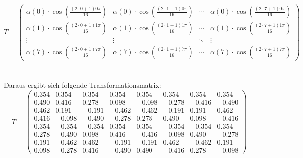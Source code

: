 \documentclass[12pt]{article}
\begin{document}
		
		\[
		T = \left( \begin{array}{cccccccc}
			\alpha(0) \cdot \cos\left(\frac{(2\cdot0+1)0\pi}{16}\right) & \alpha(0) \cdot \cos\left(\frac{(2\cdot1+1)0\pi}{16}\right) & \cdots & \alpha(0) \cdot \cos\left(\frac{(2\cdot7+1)0\pi}{16}\right) \\
			\alpha(1) \cdot \cos\left(\frac{(2\cdot0+1)1\pi}{16}\right) & \alpha(1) \cdot \cos\left(\frac{(2\cdot1+1)1\pi}{16}\right) & \cdots & \alpha(1) \cdot \cos\left(\frac{(2\cdot7+1)1\pi}{16}\right) \\
			\vdots & \vdots & \ddots & \vdots \\
			\alpha(7) \cdot \cos\left(\frac{(2\cdot0+1)7\pi}{16}\right) & \alpha(7) \cdot \cos\left(\frac{(2\cdot1+1)7\pi}{16}\right) & \cdots & \alpha(7) \cdot \cos\left(\frac{(2\cdot7+1)7\pi}{16}\right)
		\end{array} \right)
		\]
		\\\\
		Daraus ergibt sich folgende Transformationsmatrix: \\
	\[
	T = \left( \begin{array}{cccccccc}
			0.354 & 0.354 & 0.354 & 0.354 & 0.354 & 0.354 & 0.354 & 0.354 \\
			0.490 & 0.416 & 0.278 & 0.098 & -0.098 & -0.278 & -0.416 & -0.490 \\
			0.462 & 0.191 & -0.191 & -0.462 & -0.462 & -0.191 & 0.191 & 0.462 \\
			0.416 & -0.098 & -0.490 & -0.278 & 0.278 & 0.490 & 0.098 & -0.416 \\
			0.354 & -0.354 & -0.354 & 0.354 & 0.354 & -0.354 & -0.354 & 0.354 \\
			0.278 & -0.490 & 0.098 & 0.416 & -0.416 & -0.098 & 0.490 & -0.278 \\
			0.191 & -0.462 & 0.462 & -0.191 & -0.191 & 0.462 & -0.462 & 0.191 \\
			0.098 & -0.278 & 0.416 & -0.490 & 0.490 & -0.416 & 0.278 & -0.098
	\end{array} \right)
\]
		\\
		
	
	
	
\end{document}
